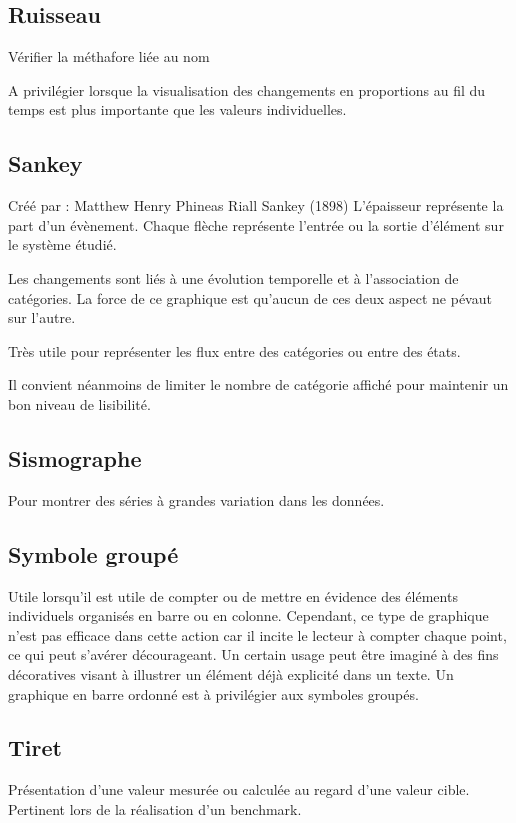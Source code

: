 \documentclass[a4paper,12pt]{article}
\begin{document}
\begin{multicols}{2}
\subsection*{Ruisseau}
\label{sec:org647362d}
Vérifier la méthafore liée au nom

A privilégier lorsque la visualisation des changements en proportions au fil du temps est plus importante que les valeurs individuelles. \autocite{alansmithLexiqueVisuel}
\subsection*{Sankey}
\label{sec:org0ea503e}
Créé par : Matthew Henry Phineas Riall Sankey (1898)
L'épaisseur représente la part d'un évènement. Chaque flèche représente l'entrée ou la sortie d'élément sur le système étudié. \autocite{mikeyiHowChooseRight2020}

Les changements sont liés à une évolution temporelle et à l'association de catégories. La force de ce graphique est qu'aucun de ces deux aspect ne pévaut sur l'autre. \autocite{jonathanschwabishComparingCategories2021}

Très utile pour représenter les flux entre des catégories ou entre des états. \autocite{jonathanschwabishComparingCategories2021}

Il convient néanmoins de limiter le nombre de catégorie  affiché pour maintenir un bon niveau de lisibilité. \autocite{jonathanschwabishComparingCategories2021}
\subsection*{Sismographe}
\label{sec:orga3ff88d}
Pour montrer des séries à grandes variation dans les données. \autocite{alansmithLexiqueVisuel}
\subsection*{Symbole groupé}
\label{sec:org10de83b}
Utile lorsqu'il est utile de compter ou de mettre en évidence des éléments individuels organisés en barre ou en colonne. \autocite{alansmithLexiqueVisuel} Cependant, ce type de graphique n'est pas efficace dans cette action car il incite le lecteur à compter chaque point, ce qui peut s'avérer décourageant. \autocite{stephenfewSillyGraphsThat2012} Un certain usage peut être imaginé à des fins décoratives visant à illustrer un élément déjà explicité dans un texte. Un graphique en barre ordonné est à privilégier aux symboles groupés.
\subsection*{Tiret}
\label{sec:org4015765}
Présentation d'une valeur mesurée ou calculée au regard d'une valeur cible. \autocite{alansmithLexiqueVisuel} Pertinent lors de la réalisation d'un benchmark. \autocite{mikeyiHowChooseRight2020}

\end{multicols}
\end{document}
